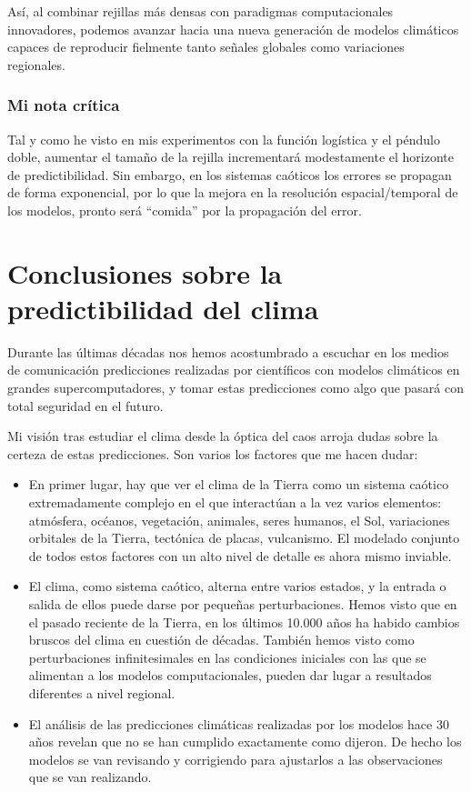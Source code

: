 \documentclass[
  10pt,
  a4paper,
  DIV=11,
  numbers=noendperiod,
  open=any]{scrreprt}
\providecommand{\tightlist}{%
  \setlength{\itemsep}{0pt}\setlength{\parskip}{0pt}}
\numberwithin{equation}{chapter}
\numberwithin{equation}{section}
\renewcommand{\[}{\begin{equation}}
\renewcommand{\]}{\end{equation}}
\begin{document}
Así, al combinar rejillas más densas con paradigmas computacionales
innovadores, podemos avanzar hacia una nueva generación de modelos
climáticos capaces de reproducir fielmente tanto señales globales como
variaciones regionales.

\subsection{Mi nota crítica}\label{mi-nota-cruxedtica}

Tal y como he visto en mis experimentos con la función logística y el
péndulo doble, aumentar el tamaño de la rejilla incrementará modestamente el horizonte de predictibilidad. Sin embargo, en los sistemas caóticos los errores se
propagan de forma exponencial, por lo que la mejora en la resolución
espacial/temporal de los modelos, pronto será ``comida'' por la
propagación del error.


\chapter{Conclusiones sobre la predictibilidad del
clima}\label{conclusiones-sobre-la-predictibilidad-del-clima}

Durante las últimas décadas nos hemos acostumbrado a escuchar en los
medios de comunicación predicciones realizadas por científicos con
modelos climáticos en grandes supercomputadores, y tomar estas
predicciones como algo que pasará con total seguridad en el futuro.

Mi visión tras estudiar el clima desde la óptica del caos arroja dudas
sobre la certeza de estas predicciones. Son varios los factores que me
hacen dudar:

\begin{itemize}
\tightlist
\item
  En primer lugar, hay que ver el clima de la Tierra como un sistema
  caótico extremadamente complejo en el que interactúan a la vez varios
  elementos: atmósfera, océanos, vegetación, animales, seres humanos, el
  Sol, variaciones orbitales de la Tierra, tectónica de placas,
  vulcanismo. El modelado conjunto de todos estos factores con un alto
  nivel de detalle es ahora mismo inviable.
\item
  El clima, como sistema caótico, alterna entre varios estados, y la entrada o salida de ellos puede darse por pequeñas
  perturbaciones. Hemos visto que en el pasado reciente de la Tierra,
  en los últimos 10.000 años ha habido cambios bruscos del clima en
  cuestión de décadas. También hemos visto como perturbaciones
  infinitesimales en las condiciones iniciales con las que se alimentan
  a los modelos computacionales, pueden dar lugar a resultados
  diferentes a nivel regional.
\item
  El análisis de las predicciones climáticas realizadas por los modelos
  hace 30 años revelan que no se han cumplido exactamente como dijeron. De hecho los modelos se van revisando y corrigiendo para ajustarlos a las observaciones que se van realizando.
\end{itemize}
\end{document}
